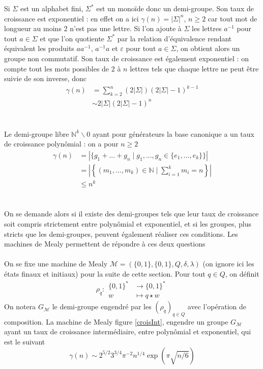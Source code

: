 \documentclass{scrartcl}
\begin{document}
\begin{flushleft}
Si $\Sigma$ est un alphabet fini, $\Sigma^*$ est un monoïde donc un demi-groupe. Son taux de croissance est exponentiel : en effet
on a ici $\gamma(n) = |\Sigma|^n$, $n \geq 2$ car tout mot de longueur au moins 2 n'est pas une lettre. Si l'on ajoute à $\Sigma$
les lettres $a^{-1}$ pour tout $a \in \Sigma$ et que l'on quotiente $\Sigma^*$ par la relation d'équivalence rendant équivalent les produits $aa^{-1}$,
$a^{-1}a$ et $\varepsilon$ pour tout $a \in \Sigma$, on obtient alors un groupe non commutatif. Son taux de croissance est également exponentiel :
on compte tout les mots possibles de $2$ à $n$ lettres tels que chaque lettre ne peut être suivie de son inverse, donc
\begin{align*}
    \gamma(n) &= \sum_{k=2}^n (2|\Sigma|)(2|\Sigma|-1)^{k-1}\\
    &\sim 2|\Sigma|(2|\Sigma|-1)^n
\end{align*}
\\~\\
Le demi-groupe libre $\mathbb{N}^k \backslash 0$ ayant pour générateurs la base canonique a un taux de croissance polynômial : on a pour $n \geq 2$
\begin{align*}
    \gamma(n) &= |\{g_1 + ... + g_n \mid g_1, ..., g_n \in \{ e_1, ..., e_k \} \}|\\
    &= \left| \left\{ (m_1, ..., m_k) \in \mathbb{N} \mid \sum_{i=1}^k m_i = n 
    \right\} \right|\\
    &\leq n^k
\end{align*}
\\~\\
On se demande alors si il existe des demi-groupes tels que leur taux de croissance soit compris strictement entre polynômial et exponentiel, et si
les groupes, plus stricts que les demi-groupes, peuvent également réaliser ces conditions.
Les machines de Mealy permettent de répondre à ces deux questions
\\~\\
On se fixe une machine de Mealy $\mathcal{M} = (\{0, 1\}, \{0, 1\}, Q, \delta, \lambda)$ (on ignore ici les états finaux et initiaux)
pour la suite de cette section. Pour tout $q \in Q$, on définit
\[ \rho_q : \begin{array}{cl}
    \{0, 1\}^* &\longrightarrow \{0, 1\}^*\\
    w &\longmapsto q \star w 
\end{array} \]
On notera $G_{\mathcal{M}}$ le demi-groupe engendré par les $(\rho_q)_{q \in Q}$ avec l'opération de composition. La machine de Mealy figure
\ref{croisInt},
engendre un groupe $G_{\mathcal{M}}$ ayant un taux de croissance intermédiaire, entre polynômial et exponentiel, qui est le suivant \cite{intGrowth}
\[ \gamma(n) \sim 2^{5/2}3^{3/4}\pi^{-2}n^{1/4}\exp(\pi\sqrt{n/6}) \]


\end{flushleft}
\end{document}
